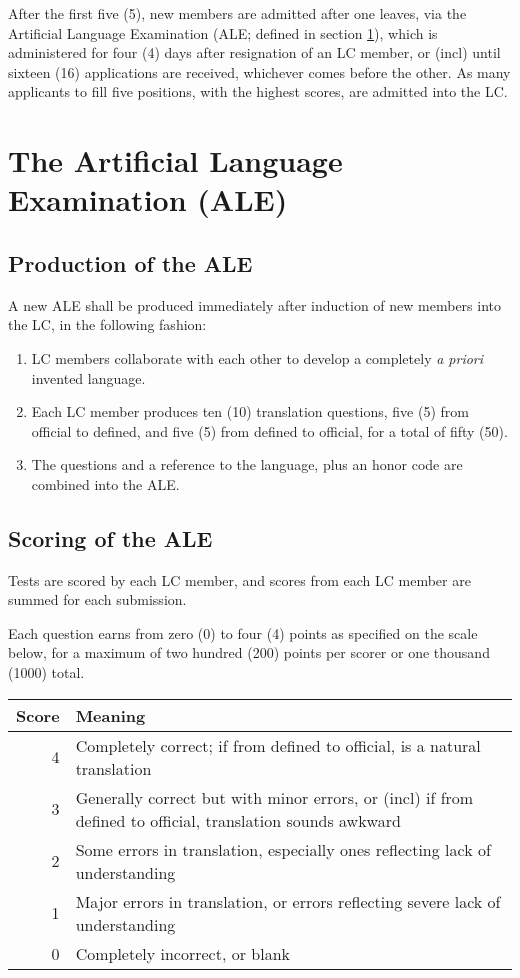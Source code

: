 \documentclass[10pt]{book}
\begin{document}
After the first five (5), new members are admitted after one leaves, via the Artificial Language Examination (ALE; defined in section \ref{sec:ale}), which is administered for four (4) days after resignation of an LC member, or (incl) until sixteen (16) applications are received, whichever comes before the other. As many applicants to fill five positions, with the highest scores, are admitted into the LC.

\section{The Artificial Language Examination (ALE)}
\label{sec:ale}

\subsection{Production of the ALE}

A new ALE shall be produced immediately after induction of new members into the LC, in the following fashion:

\begin{enumerate}
 \item LC members collaborate with each other to develop a completely \emph{a priori} invented language.
 \item Each LC member produces ten (10) translation questions, five (5) from official to defined, and five (5) from defined to official, for a total of fifty (50).
 \item The questions and a reference to the language, plus an honor code are combined into the ALE.
\end{enumerate}

\subsection{Scoring of the ALE}

Tests are scored by each LC member, and scores from each LC member are summed for each submission.

Each question earns from zero (0) to four (4) points as specified on the scale below, for a maximum of two hundred (200) points per scorer or one thousand (1000) total.

\begin{tabular}{|r|p{5cm}|}
 \hline
 Score & Meaning \\ \hline
 4 & Completely correct; if from defined to official, is a natural translation \\
 3 & Generally correct but with minor errors, or (incl) if from defined to official, translation sounds awkward \\
 2 & Some errors in translation, especially ones reflecting lack of understanding \\
 1 & Major errors in translation, or errors reflecting severe lack of understanding \\
 0 & Completely incorrect, or blank \\
 \hline
\end{tabular}
\end{document}
